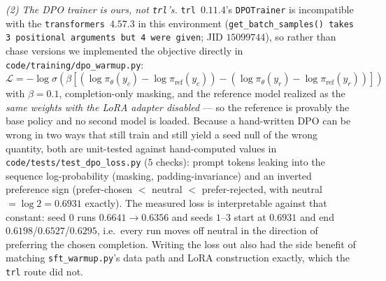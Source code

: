 \documentclass{article}
\begin{document}
\emph{(2) The DPO trainer is ours, not \texttt{trl}'s.} \texttt{trl}~$0.11.4$'s \texttt{DPOTrainer} is incompatible with the \texttt{transformers}~$4.57.3$ in this environment (\texttt{get\_batch\_samples() takes 3 positional arguments but 4 were given}; JID $15099744$), so rather than chase versions we implemented the objective directly in \texttt{code/training/dpo\_warmup.py}: $\mathcal{L}=-\log\sigma(\beta[(\log\pi_\theta(y_c)-\log\pi_{\text{ref}}(y_c))-(\log\pi_\theta(y_r)-\log\pi_{\text{ref}}(y_r))])$ with $\beta{=}0.1$, completion-only masking, and the reference model realized as the \emph{same weights with the LoRA adapter disabled} --- so the reference is provably the base policy and no second model is loaded. Because a hand-written DPO can be wrong in two ways that still train and still yield a seed null of the wrong quantity, both are unit-tested against hand-computed values in \texttt{code/tests/test\_dpo\_loss.py} ($5$ checks): prompt tokens leaking into the sequence log-probability (masking, padding-invariance) and an inverted preference sign (prefer-chosen $<$ neutral $<$ prefer-rejected, with neutral $=\log 2=0.6931$ exactly). The measured loss is interpretable against that constant: seed $0$ runs $0.6641\to0.6356$ and seeds $1$--$3$ start at $0.6931$ and end $0.6198$/$0.6527$/$0.6295$, i.e.\ every run moves off neutral in the direction of preferring the chosen completion. Writing the loss out also had the side benefit of matching \texttt{sft\_warmup.py}'s data path and LoRA construction exactly, which the \texttt{trl} route did not.
\end{document}
